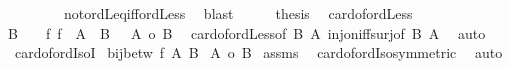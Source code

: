 \begin{isabellebody}
\ \ \ \ \ \ \ \ not{\isacharunderscore}{\kern0pt}ordLeq{\isacharunderscore}{\kern0pt}iff{\isacharunderscore}{\kern0pt}ordLess\ \isamarkupfalse%
\ blast\isanewline
\ \ \isamarkupfalse%
\ \isamarkupfalse%
\ {\isacharquery}{\kern0pt}thesis\ \isacommand{{\isachardot}{\kern0pt}}\isamarkupfalse%
\isanewline
{}\isamarkupfalse%
%
\endisatagproof
{\isafoldproof}%
%
\isadelimproof
\isanewline
%
\endisadelimproof
\isanewline
{}\isamarkupfalse%
\ card{\isacharunderscore}{\kern0pt}of{\isacharunderscore}{\kern0pt}ordLess{}{\isacharcolon}{\kern0pt}\isanewline
{\isachardoublequoteopen}B\ {\isasymnoteq}\ {\isacharbraceleft}{\kern0pt}{\isacharbraceright}{\kern0pt}\ {\isasymLongrightarrow}\ {\isacharparenleft}{\kern0pt}{\isasymnot}{\isacharparenleft}{\kern0pt}{\isasymexists}f{\isachardot}{\kern0pt}\ f\ {\isacharbackquote}{\kern0pt}\ A\ {\isacharequal}{\kern0pt}\ B{\isacharparenright}{\kern0pt}{\isacharparenright}{\kern0pt}\ {\isacharequal}{\kern0pt}\ {\isacharparenleft}{\kern0pt}\ {\isacharbar}{\kern0pt}A{\isacharbar}{\kern0pt}\ {\isacharless}{\kern0pt}o\ {\isacharbar}{\kern0pt}B{\isacharbar}{\kern0pt}\ {\isacharparenright}{\kern0pt}{\isachardoublequoteclose}\isanewline
%
\isadelimproof
%
\endisadelimproof
%
\isatagproof
{}\isamarkupfalse%
\ card{\isacharunderscore}{\kern0pt}of{\isacharunderscore}{\kern0pt}ordLess{\isacharbrackleft}{\kern0pt}of\ B\ A{\isacharbrackright}{\kern0pt}\ inj{\isacharunderscore}{\kern0pt}on{\isacharunderscore}{\kern0pt}iff{\isacharunderscore}{\kern0pt}surj{\isacharbrackleft}{\kern0pt}of\ B\ A{\isacharbrackright}{\kern0pt}\ \isamarkupfalse%
\ auto%
\endisatagproof
{\isafoldproof}%
%
\isadelimproof
\isanewline
%
\endisadelimproof
\isanewline
{}\isamarkupfalse%
\ card{\isacharunderscore}{\kern0pt}of{\isacharunderscore}{\kern0pt}ordIsoI{\isacharcolon}{\kern0pt}\isanewline
{}\ {\isachardoublequoteopen}bij{\isacharunderscore}{\kern0pt}betw\ f\ A\ B{\isachardoublequoteclose}\isanewline
{}\ {\isachardoublequoteopen}{\isacharbar}{\kern0pt}A{\isacharbar}{\kern0pt}\ {\isacharequal}{\kern0pt}o\ {\isacharbar}{\kern0pt}B{\isacharbar}{\kern0pt}{\isachardoublequoteclose}\isanewline
%
\isadelimproof
%
\endisadelimproof
%
\isatagproof
{}\isamarkupfalse%
\ assms\ \isamarkupfalse%
\ card{\isacharunderscore}{\kern0pt}of{\isacharunderscore}{\kern0pt}ordIso{\isacharbrackleft}{\kern0pt}symmetric{\isacharbrackright}{\kern0pt}\ \isamarkupfalse%
\ auto%

\end{isabellebody}
